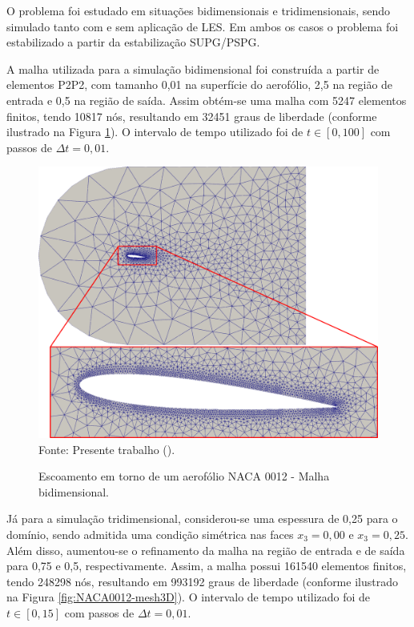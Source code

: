 O problema foi estudado em situações bidimensionais e tridimensionais, sendo simulado tanto com e sem aplicação de LES. Em ambos os casos o problema foi estabilizado a partir da estabilização SUPG/PSPG.

A malha utilizada para a simulação bidimensional foi construída a partir de elementos P2P2, com tamanho 0,01 na superfície do aerofólio, 2,5 na região de entrada e 0,5 na região de saída. Assim obtém-se uma malha com 5247 elementos finitos, tendo 10817 nós, resultando em 32451 graus de liberdade (conforme ilustrado na Figura \ref{fig:NACA0012-mesh2D}). O intervalo de tempo utilizado foi de $t\in[0,100]$ com passos de $\Delta t=0,01$.

\begin{figure}[h!]
    \centering
    \caption{Escoamento em torno de um aerofólio NACA 0012 - Malha bidimensional.}
    \includegraphics[width=.7\linewidth]{Figuras/NACA0012/mesh2D.png}
    \\Fonte: Presente trabalho (\the\year).
    \label{fig:NACA0012-mesh2D}
\end{figure}

Já para a simulação tridimensional, considerou-se uma espessura de 0,25 para o domínio, sendo admitida uma condição simétrica nas faces $x_3=0,00$ e $x_3=0,25$. Além disso, aumentou-se o refinamento da malha na região de entrada e de saída para 0,75 e 0,5, respectivamente. Assim, a malha possui 161540 elementos finitos, tendo 248298 nós, resultando em 993192 graus de liberdade (conforme ilustrado na Figura \ref{fig:NACA0012-mesh3D}). O intervalo de tempo utilizado foi de $t\in[0,15]$ com passos de $\Delta t=0,01$.

